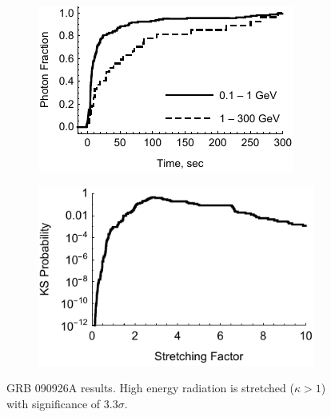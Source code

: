 \documentclass[11pt,a4paper]{article}
\begin{document}
\begin{figure}
        \centering
        \begin{subfigure}{0.49\textwidth}
                \includegraphics[width=\textwidth]{lightCurve090926A}
                \label{fig:lightCurve090926A}
        \end{subfigure}
        \begin{subfigure}{0.49\textwidth}
                \includegraphics[width=\textwidth]{probabilities090926A}
                \label{fig:probabilities090926A}
        \end{subfigure}
        \caption{GRB 090926A results. High energy radiation is stretched ($\kappa > 1$) with significance of $3.3\sigma$.}
        \label{fig:grb090926A}
\end{figure}
\end{document}
